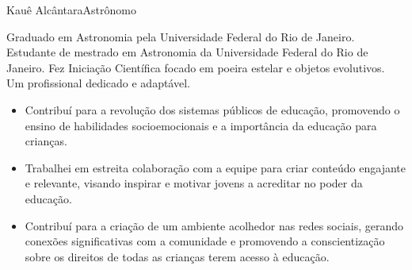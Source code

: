 \documentclass{article}
\begin{document}
\begin{cv}[fotocv]{Kauê Alcântara}{Astrônomo}


Graduado em Astronomia pela Universidade Federal do Rio de Janeiro. Estudante de mestrado em Astronomia da Universidade Federal do Rio de Janeiro. Fez Iniciação Científica focado em poeira estelar e objetos evolutivos. 
Um profissional dedicado e adaptável.


\begin{cvevent}[2023][2020]
    \begin{itemize}
        \item Contribuí para a revolução dos sistemas públicos de educação, promovendo o ensino de habilidades socioemocionais e a importância da educação para crianças.
        \item Trabalhei em estreita colaboração com a equipe para criar conteúdo engajante e relevante, visando inspirar e motivar jovens a acreditar no poder da educação.
        \item Contribuí para a criação de um ambiente acolhedor nas redes sociais, gerando conexões significativas com a comunidade e promovendo a conscientização sobre os direitos de todas as crianças terem acesso à educação.
    \end{itemize}
\end{cvevent}

\begin{cvevent}[2020]
\end{cvevent}



\begin{cvevent}[presente][2026]
\end{cvevent}

\begin{cvevent}[2026][2022]
\end{cvevent}

\vspace{15pt}


\end{cv}
\end{document}
